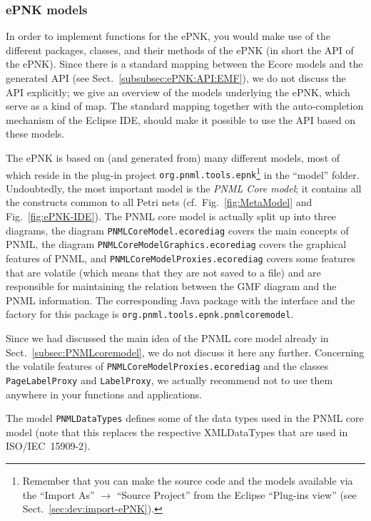\subsubsection{ePNK models}

In order to implement functions for the ePNK, you would make use of the
different packages, classes, and their methods of the ePNK (in short the API of the ePNK).
Since there is a standard mapping between the Ecore models and the generated API (see
Sect.~\ref{subsubsec:ePNK:API:EMF}), we do not discuss the API explicitly;
we give an overview of the models underlying the ePNK, which serve as a kind
of map. The standard mapping together with the auto-completion mechanism
of the Eclipse IDE, should make it possible to use the API based on these
models.

%
The ePNK is based on (and generated from) many different models, most of
which reside in the plug-in project {\tt org.pnml.tools.epnk}\footnote
  {Remember that you can make the source code and the models available
   via the ``Import As'' $\rightarrow$ ``Source Project'' from the
   Eclipse ``Plug-ins view'' (see Sect.~\ref{sec:dev:import-ePNK}).}
in the ``model'' folder. Undoubtedly, the most important model is the
\emph{PNML Core model}; it contains all the constructs common to all
Petri nets (cf.\ Fig.~\ref{fig:MetaModel} and Fig.~\ref{fig:ePNK-IDE}).
The PNML core model is actually split up into three diagrams, the diagram
{\tt PNMLCoreModel.ecorediag} covers the main concepts of PNML, the
diagram {\tt PNMLCoreModelGraphics.ecorediag} covers the graphical features
of PNML, and {\tt PNMLCoreModelProxies.ecorediag} covers some features
that are volatile (which means that they are not saved to a file) and
are responsible for maintaining the relation between the GMF diagram
and the PNML information. The corresponding Java package with the interface
and the factory for this package is {\tt org.pnml.tools.epnk.pnmlcoremodel}.

Since we had discussed the main idea of the PNML core model already in
Sect.~\ref{subsec:PNMLcoremodel}, we do not discuss it here any further.
Concerning the volatile features of  {\tt PNMLCoreModelProxies.ecorediag}
and the classes {\tt PageLabelProxy} and {\tt LabelProxy}, we actually
recommend not to use them anywhere in your functions and applications.

The model {\tt PNMLDataTypes} defines some of the data types used in
the PNML core model (note that this replaces the respective XMLDataTypes
that are used in ISO/IEC~15909-2).%

